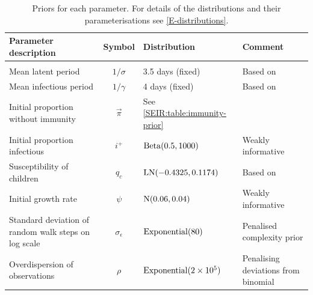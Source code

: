 \documentclass[thesis.tex]{subfiles}
\begin{document}
\begin{landscape}
\begin{table}
\begin{tabular}{l c l l}
    Parameter description & Symbol & Distribution & Comment \\
    \hline \\
    Mean latent period & $1/\sigma$ & 3.5 days (fixed) & Based on \textcite{zhaoEstimating} \\
    Mean infectious period & $1/\gamma$ & 4 days (fixed) & Based on \textcite{zhaoEstimating} \\
    Initial proportion without immunity & $\vec\pi$ & See \cref{SEIR:table:immunity-prior} & \\
    Initial proportion infectious & $i^+$ & $\operatorname{Beta}(0.5, 1000)$ & Weakly informative \\
    Susceptibility of children & $q_c$ & $\operatorname{LN}(-0.4325, 0.1174)$ & Based on \textcite{vinerTransmission}  \\
    Initial growth rate & $\psi$ & $\operatorname{N}(0.06, 0.04)$ & Weakly informative \\
    Standard deviation of random walk steps on log scale & $\sigma_\epsilon$ & $\operatorname{Exponential}(80)$ & Penalised complexity prior \\
    Overdispersion of observations & $\rho$ & $\operatorname{Exponential}(2 \times 10^5)$ & Penalising deviations from binomial
\end{tabular}
\caption[SEIR model priors]{Priors for each parameter. For details of the distributions and their parameterisations see \cref{E-distributions}.}
\label{SEIR:table:priors}
\end{table}
\begin{table}


\end{table}
\end{landscape}
\end{document}
